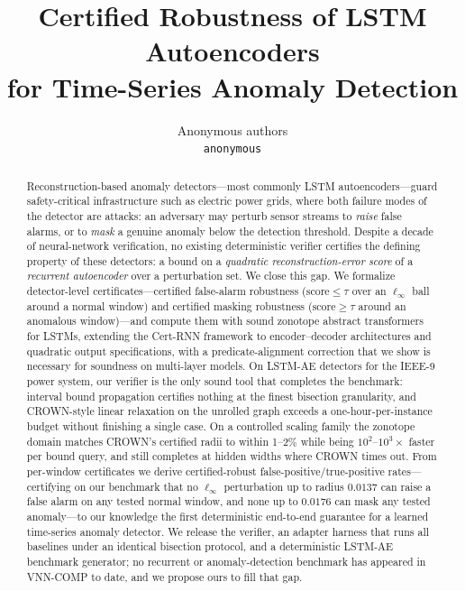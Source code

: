 \documentclass{article} %
\title{Certified Robustness of LSTM Autoencoders\\for Time-Series Anomaly Detection}
\author{Anonymous authors\\
\texttt{anonymous}}
\newcommand{\score}{\mathrm{score}}
\begin{document}
\maketitle

\begin{abstract}
Reconstruction-based anomaly detectors---most commonly LSTM
autoencoders---guard safety-critical infrastructure such as electric
power grids, where both failure modes of the detector are attacks: an
adversary may perturb sensor streams to \emph{raise} false alarms, or to
\emph{mask} a genuine anomaly below the detection threshold. Despite a
decade of neural-network verification, no existing deterministic
verifier certifies the defining property of these detectors: a bound on
a \emph{quadratic reconstruction-error score} of a \emph{recurrent
autoencoder} over a perturbation set. We close this gap. We formalize
detector-level certificates---certified false-alarm robustness
($\score \le \tau$ over an $\ell_\infty$ ball around a normal window)
and certified masking robustness ($\score \ge \tau$ around an anomalous
window)---and compute them with sound zonotope abstract transformers for
LSTMs, extending the Cert-RNN framework
to encoder--decoder architectures and quadratic output specifications,
with a predicate-alignment correction that we show is necessary for
soundness on multi-layer models. On LSTM-AE detectors for the IEEE-9
power system, our verifier is the only sound tool that completes the
benchmark: interval bound propagation certifies nothing at the finest
bisection granularity, and CROWN-style linear relaxation on the
unrolled graph exceeds a one-hour-per-instance budget without
finishing a single case. On a controlled scaling family the zonotope
domain matches CROWN's certified radii to within 1--2\% while being
$10^2$--$10^3\times$ faster per bound query, and still completes at
hidden widths where CROWN times out. From per-window certificates we
derive certified-robust false-positive/true-positive rates---certifying
on our benchmark that no $\ell_\infty$ perturbation up to radius
$0.0137$ can raise a false alarm on any tested normal window, and none
up to $0.0176$ can mask any tested anomaly---to our knowledge the
first deterministic end-to-end guarantee for a learned time-series
anomaly detector. We release the verifier, an adapter harness that runs
all baselines under an identical bisection protocol, and a deterministic
LSTM-AE benchmark generator; no recurrent or anomaly-detection benchmark
has appeared in VNN-COMP to date, and we propose ours to fill that gap.
\end{abstract}
\end{document}
